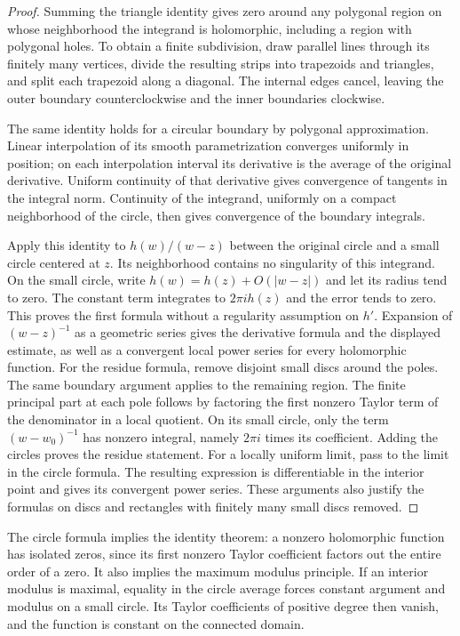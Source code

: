 \documentclass[11pt]{article}
\theoremstyle{definition}
\theoremstyle{remark}
\numberwithin{equation}{section}
\begin{document}
\begin{proof}
Summing the triangle identity gives zero around any polygonal region
on whose neighborhood the integrand is holomorphic, including a region
with polygonal holes.  To obtain a finite subdivision, draw parallel
lines through its finitely many vertices, divide the resulting strips
into trapezoids and triangles, and split each trapezoid along a diagonal.
The internal edges cancel, leaving the outer boundary counterclockwise
and the inner boundaries clockwise.

The same identity holds for a circular boundary by polygonal
approximation.  Linear interpolation of its smooth parametrization
converges uniformly in position; on each interpolation interval its
derivative is the average of the original derivative.  Uniform continuity
of that derivative gives convergence of tangents in the integral norm.
Continuity of the integrand, uniformly on a compact neighborhood of the
circle, then gives convergence of the boundary integrals.

Apply this identity to $h(w)/(w-z)$ between the original circle and a
small circle centered at $z$.  Its neighborhood contains no singularity
of this integrand.  On the small circle, write
$h(w)=h(z)+O(|w-z|)$ and let its radius tend to zero.
The constant term integrates to $2\pi i h(z)$ and the error tends to zero.
This proves the first formula without a regularity assumption on $h'$.
Expansion of $(w-z)^{-1}$ as a geometric series gives the derivative formula
and the displayed estimate, as well as a convergent local power series
for every holomorphic function.
For the residue formula, remove disjoint small discs around the poles.
The same boundary argument applies to the remaining region.
The finite principal part at each pole follows by factoring the first
nonzero Taylor term of the denominator in a local quotient.
On its small circle, only the term $(w-w_0)^{-1}$ has nonzero integral,
namely $2\pi i$ times its coefficient.  Adding the circles proves the
residue statement.
For a locally uniform limit, pass to the limit in the circle formula.
The resulting expression is differentiable in the interior point and gives
its convergent power series.  These arguments also justify the formulas
on discs and rectangles with finitely many small discs removed.
\end{proof}

The circle formula implies the identity theorem: a nonzero holomorphic
function has isolated zeros, since its first nonzero Taylor coefficient
factors out the entire order of a zero.  It also implies the maximum
modulus principle.  If an interior modulus is maximal, equality in the
circle average forces constant argument and modulus on a small circle.
Its Taylor coefficients of positive degree then vanish, and the function
is constant on the connected domain.
\end{document}
